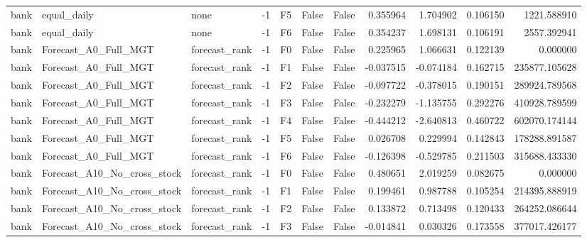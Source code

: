 \begin{tabular}{lllrlllrrrr}
      bank &                  equal\_daily &          none &    -1 &  F5 &           False &            False &  0.355964 &  1.704902 & 0.106150 &      1221.588910 \\
      bank &                  equal\_daily &          none &    -1 &  F6 &           False &            False &  0.354237 &  1.698131 & 0.106191 &      2557.392941 \\
      bank &         Forecast\_A0\_Full\_MGT & forecast\_rank &    -1 &  F0 &           False &            False &  0.225965 &  1.066631 & 0.122139 &         0.000000 \\
      bank &         Forecast\_A0\_Full\_MGT & forecast\_rank &    -1 &  F1 &           False &            False & -0.037515 & -0.074184 & 0.162715 &    235877.105628 \\
      bank &         Forecast\_A0\_Full\_MGT & forecast\_rank &    -1 &  F2 &           False &            False & -0.097722 & -0.378015 & 0.190151 &    289924.789568 \\
      bank &         Forecast\_A0\_Full\_MGT & forecast\_rank &    -1 &  F3 &           False &            False & -0.232279 & -1.135755 & 0.292276 &    410928.789599 \\
      bank &         Forecast\_A0\_Full\_MGT & forecast\_rank &    -1 &  F4 &           False &            False & -0.444212 & -2.640813 & 0.460722 &    602070.174144 \\
      bank &         Forecast\_A0\_Full\_MGT & forecast\_rank &    -1 &  F5 &           False &            False &  0.026708 &  0.229994 & 0.142843 &    178288.891587 \\
      bank &         Forecast\_A0\_Full\_MGT & forecast\_rank &    -1 &  F6 &           False &            False & -0.126398 & -0.529785 & 0.211503 &    315688.433330 \\
      bank &  Forecast\_A10\_No\_cross\_stock & forecast\_rank &    -1 &  F0 &           False &            False &  0.480651 &  2.019259 & 0.082675 &         0.000000 \\
      bank &  Forecast\_A10\_No\_cross\_stock & forecast\_rank &    -1 &  F1 &           False &            False &  0.199461 &  0.987788 & 0.105254 &    214395.888919 \\
      bank &  Forecast\_A10\_No\_cross\_stock & forecast\_rank &    -1 &  F2 &           False &            False &  0.133872 &  0.713498 & 0.120433 &    264252.086644 \\
      bank &  Forecast\_A10\_No\_cross\_stock & forecast\_rank &    -1 &  F3 &           False &            False & -0.014841 &  0.030326 & 0.173558 &    377017.426177 \\

\end{tabular}
